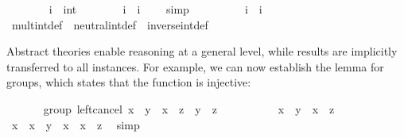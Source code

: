 \begin{isabellebody}
\ \ \ \ \ \ \isamarkupfalse%
\ i\ {\isacharcolon}{\isacharcolon}\ int\isanewline
\ \ \ \ \ \ \isamarkupfalse%
\ {\isachardoublequoteopen}{\isacharminus}i\ {\isacharplus}\ i\ {\isacharequal}\ {}{\isachardoublequoteclose}\ \isamarkupfalse%
\ simp\isanewline
\ \ \ \ \ \ \isamarkupfalse%
\ \isamarkupfalse%
\ {\isachardoublequoteopen}i{\isasymdiv}\ {\isasymotimes}\ i\ {\isacharequal}\ {\isasymone}{\isachardoublequoteclose}\ \isamarkupfalse%
\ mult{\isacharunderscore}int{\isacharunderscore}def\ \ neutral{\isacharunderscore}int{\isacharunderscore}def\ \ inverse{\isacharunderscore}int{\isacharunderscore}def\ \isacommand{{\isachardot}}\isamarkupfalse%
\isanewline
\ \ \ \ \isamarkupfalse%
%
\endisatagproof
{\isafoldproof}%
%
\isadelimproof
%
\endisadelimproof
%
\isamarkuptrue%
%
\begin{isamarkuptext}%
Abstract theories enable reasoning at a general level, while results
  are implicitly transferred to all instances.  For example, we can
  now establish the  lemma for groups, which
  states that the function  is injective:%
\end{isamarkuptext}%
\isamarkuptrue%
\ \ \ \ \isamarkupfalse%
\ {\isacharparenleft}\ group{\isacharparenright}\ left{\isacharunderscore}cancel{\isacharcolon}\ {\isachardoublequoteopen}x\ \isactrlloc {\isasymotimes}\ y\ {\isacharequal}\ x\ \isactrlloc {\isasymotimes}\ z\ {\isasymlongleftrightarrow}\ y\ {\isacharequal}\ z{\isachardoublequoteclose}\isanewline
%
\isadelimproof
\ \ \ \ %
\endisadelimproof
%
\isatagproof
{}\isamarkupfalse%
\isanewline
\ \ \ \ \isamarkupfalse%
\ {\isachardoublequoteopen}x\ \isactrlloc {\isasymotimes}\ y\ {\isacharequal}\ x\ \isactrlloc {\isasymotimes}\ z{\isachardoublequoteclose}\isanewline
\ \ \ \ \ \ \ \ \isamarkupfalse%
\ \isamarkupfalse%
\ {\isachardoublequoteopen}x\isactrlloc {\isasymdiv}\ \isactrlloc {\isasymotimes}\ {\isacharparenleft}x\ \isactrlloc {\isasymotimes}\ y{\isacharparenright}\ {\isacharequal}\ x\isactrlloc {\isasymdiv}\ \isactrlloc {\isasymotimes}\ {\isacharparenleft}x\ \isactrlloc {\isasymotimes}\ z{\isacharparenright}{\isachardoublequoteclose}\ \isamarkupfalse%
\ simp\isanewline
\ \ \ \ \ \ \ \ \isamarkupfalse%

\end{isabellebody}
